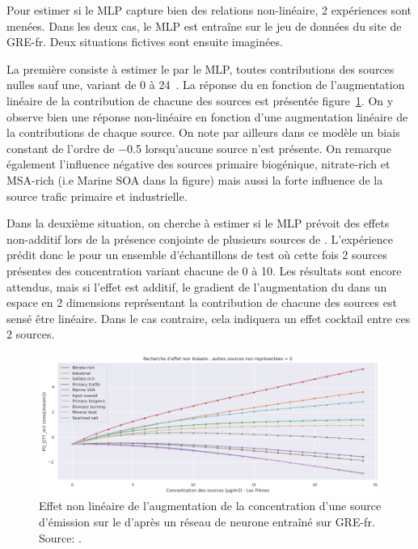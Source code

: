 Pour estimer si le MLP capture bien des relations non-linéaire, 2 expériences sont menées.
Dans les deux cas, le MLP est entraîne sur le jeu de données du site de GRE-fr. Deux
situations fictives sont ensuite imaginées.

La première consiste à estimer le \PODTTv{} par le MLP, toutes contributions des sources
nulles sauf une, variant de 0 à 24~\si{\ugm}. La réponse du \PODTTv{} en fonction de
l'augmentation linéaire de la contribution de chacune des sources est présentée
figure~\ref{fig:figures/chapter05/10sourcesLinearite}. On y observe bien une réponse
non-linéaire en fonction d'une augmentation linéaire de la contributions de
chaque source. On note par ailleurs dans ce modèle un biais constant de l'ordre de
\SI{-0.5}{\opv} lorsqu'aucune source n'est présente.
On remarque également l'influence négative des sources primaire biogénique, nitrate-rich
et MSA-rich (i.e Marine SOA dans la figure) mais aussi la forte influence de la source
trafic primaire et industrielle.

Dans la deuxième situation, on cherche à estimer si le MLP prévoit des effets non-additif
lors de la présence conjointe de plusieurs sources de \PMdix. L'expérience prédit donc le
\PODTTv{} pour un ensemble d'échantillons de test où cette fois 2 sources présentes des
concentration variant chacune de 0 à \SI{10}{\ugm}. Les résultats sont encore attendus,
mais si l'effet est additif, le gradient de l'augmentation du \PODTTv{} dans un espace en
2 dimensions représentant la contribution de chacune des sources est sensé être linéaire.
Dans le cas contraire, cela indiquera un effet cocktail entre ces 2 sources.

\begin{figure}[ht]
    \centering
    \includegraphics[width=0.8\linewidth]{figures/chapter05/10sourcesLinearite.PNG}
    \caption{Effet non linéaire de l'augmentation de la concentration d'une source
        d'émission sur le \PODTTv{} d'après un réseau de neurone entraîné sur GRE-fr. Source: \cite{fichesMachine2020}.}%
    \label{fig:figures/chapter05/10sourcesLinearite}
\end{figure}

